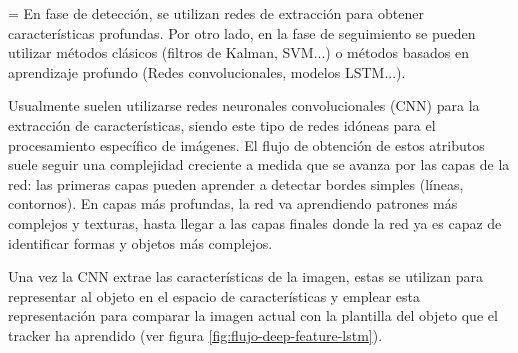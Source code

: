 {\leftskip=\parindent
\indent En fase de detección, se utilizan redes de extracción para obtener características profundas. Por otro lado, en la fase de seguimiento se pueden utilizar métodos clásicos (filtros de Kalman, SVM...) o métodos basados en aprendizaje profundo (Redes convolucionales, modelos LSTM...).

Usualmente suelen utilizarse redes neuronales convolucionales (CNN) para la extracción de características, siendo este tipo de redes idóneas para el procesamiento específico de imágenes. El flujo de obtención de estos atributos suele seguir una complejidad creciente a medida que se avanza por las capas de la red: las primeras capas pueden aprender a detectar bordes simples (líneas, contornos). En capas más profundas, la red va aprendiendo patrones más complejos y texturas, hasta llegar a las capas finales donde la red ya es capaz de identificar formas y objetos más complejos. 

Una vez la CNN extrae las características de la imagen, estas se utilizan para representar al objeto en el espacio de características y emplear esta representación para comparar la imagen actual con la plantilla del objeto que el tracker ha aprendido (ver figura \ref{fig:flujo-deep-feature-lstm}).

\vspace{0.35cm}
\begin{center}
\captionsetup{type=figure, font=small, skip=10pt}
\centering
{}
\end{center}}
